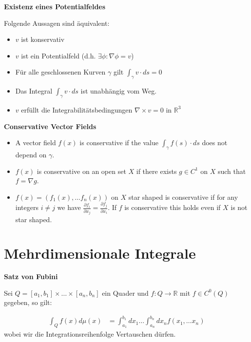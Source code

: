 \documentclass[25pt]{sciposter}
\newcommand{\R}{\mathbb{R}}
\newenvironment{method}[1]{\begin{mdframed}[backgroundcolor=blue!10,innertopmargin=15pt, innerbottommargin=15pt, nobreak=true]
		\textbf{#1 }
	}
	{ 
	\end{mdframed}
}
\begin{document}
\begin{multicols}{3}
\begin{method}{Existenz eines Potentialfeldes}
	Folgende Aussagen sind äquivalent:
	
	\begin{itemize}
		\item $v$ ist konservativ
		\item $v$ ist ein Potentialfeld  (d.h. $\exists \phi : \nabla \phi = v$)
		\item Für alle geschlossenen Kurven $\gamma$ gilt $\int_\gamma v\cdot ds = 0$
		\item Das Integral $\int_\gamma v\cdot ds$ ist unabhängig vom Weg.
		\item $v$ erfüllt die Integrabilitätsbedingungen $\nabla \times v = 0$ in $\R^3$
	\end{itemize}
	
\end{method}


\ifx
\begin{method}{Conservative Vector Fields}
	 \begin{itemize}
	 	\item 	A vector field $f(x)$ is conservative if the value $\int_{\gamma} f(s)\cdot ds$ does not depend on $\gamma$. 
	 	\item $f(x)$ is conservative on an open set $X$ if there exists $g\in C^1$ on $X$ such that $f = \nabla g$.
	 	\item  $f(x) = (f_1(x),\ldots f_n(x))$ on $X$ star shaped is conservative if for any integers $i\neq j$ we have $\frac{\partial f_i}{\partial x_j} = \frac{\partial f_j}{\partial x_i}$. If $f$ is conservative this holds even if $X$ is not star shaped.
	 \end{itemize}	
\end{method}
\fi




\section*{Mehrdimensionale Integrale}

\begin{method}{Satz von Fubini}
	Sei $Q=[a_1,b_1]\times \ldots \times [a_n,b_n]$ ein Quader und $f:Q\to \R$ mit $f\in C^0(Q)$ gegeben, so gilt:
	
	\begin{align*}
		\int_Q f(x) d\mu(x) &= \int_{a_1}^{b_1} dx_1 \ldots \int_{a_n}^{b_n} dx_n f(x_1,\ldots x_n)
	\end{align*}
	wobei wir die Integrationsreihenfolge Vertauschen dürfen.
\end{method}



\end{multicols}
\end{document}
